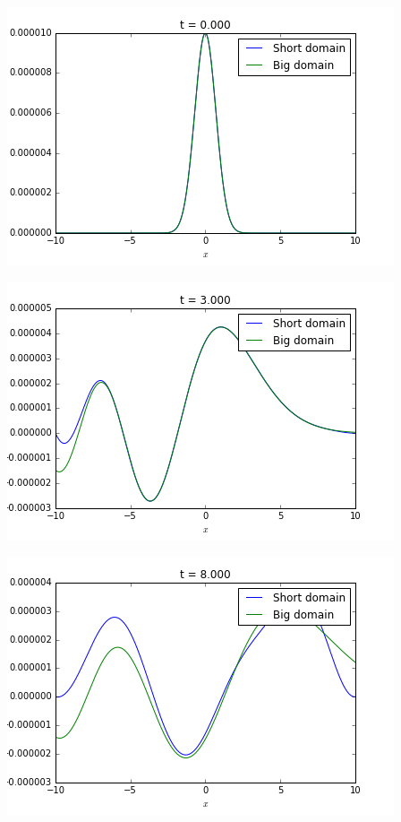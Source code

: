 \begingroup
	\noindent
	\begin{minipage}[t]{.3\linewidth}
		\includegraphics[scale=.3]{figures/motivational1A.png}	
	\end{minipage}
	\hfill
	\begin{minipage}[t]{.3\linewidth}
		\includegraphics[scale=.3]{figures/motivational1B.png}	
	\end{minipage}
	\hfill
	\begin{minipage}[t]{.3\linewidth}
		\includegraphics[scale=.3]{figures/motivational1C.png}	
	\end{minipage}
\endgroup

